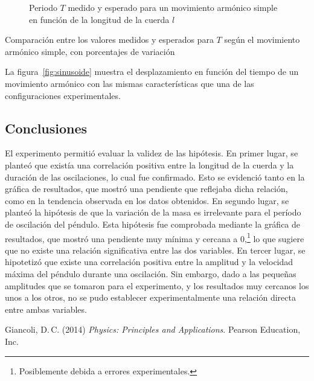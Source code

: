 \documentclass[twocolumn]{article}
\numberwithin{table}{section}
\begin{document}
\begin{figure}[ht]
  \centering
  \begin{tikzpicture}
  \end{tikzpicture}
  \caption{Periodo $T$ medido y esperado para un movimiento armónico
  simple en función de la longitud de la cuerda $l$}\label{fig:periodo_mas}
\end{figure}


\begin{table}
  \caption{Comparación entre los valores medidos y esperados para $T$
  según el movimiento armónico simple, con porcentajes de variación}
\end{table}

La figura~\ref{fig:sinusoide} muestra el desplazamiento en función del tiempo
de un movimiento armónico con las mismas características que una de las
configuraciones experimentales.

\subsection{Conclusiones}

El experimento permitió evaluar la validez de las hipótesis.
En primer lugar, se planteó que existía una correlación positiva
entre la longitud de la cuerda y la duración de las oscilaciones, lo
cual fue confirmado. Esto se evidenció tanto en la gráfica de
resultados, que mostró una pendiente que reflejaba dicha relación,
como en la tendencia observada en los datos obtenidos. En segundo
lugar, se planteó la hipótesis de que la variación de la masa es
irrelevante para el período de oscilación del péndulo. Esta hipótesis
fue comprobada mediante la gráfica de resultados, que mostró una
pendiente muy mínima y cercana a 0,\footnote{Posiblemente debida a errores
experimentales.} lo que sugiere que no existe una relación
significativa entre las dos variables. En tercer lugar, se hipotetizó
que existe una correlación positiva entre la amplitud y la velocidad
máxima del péndulo durante una oscilación. Sin embargo, dado a las
pequeñas amplitudes que se tomaron para el experimento, y los
resultados muy cercanos los unos a los otros, no se pudo establecer
experimentalmente una relación directa entre ambas variables.

\renewcommand{\refname}{Bibliografía}
\begin{thebibliography}{1}
  \bibitem{}
  Giancoli, D.\,C. (2014) \textit{Physics: Principles and
  Applications}. Pearson Education, Inc.
\end{thebibliography}
\end{document}
